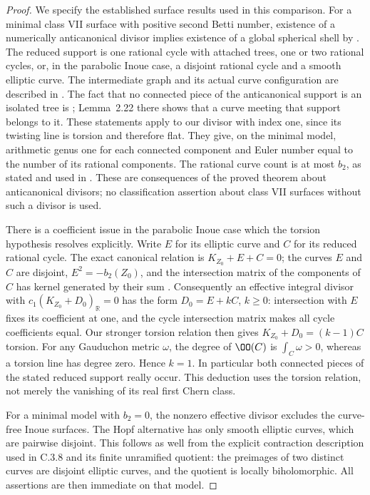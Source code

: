 \begin{proof}
We specify the established surface results used in this
comparison. For a minimal class VII surface with positive
second Betti number, existence of a numerically
anticanonical divisor implies existence of a global
spherical shell by
\cite[Theorem~0.2, Proposition~2.29 and Theorem~2.38]{Dloussky2006}.
The reduced support is one rational cycle with attached
trees, one or two rational cycles, or, in the parabolic
Inoue case, a disjoint rational cycle and a smooth elliptic
curve. The intermediate graph and its actual curve
configuration are described in
\cite[\S1, pp.~284--285, and \S3, p.~296]{DOT2003}.
The fact that no connected piece of the anticanonical
support is an isolated tree is
\cite[Corollary~2.25 and Proposition~2.27]{Dloussky2006};
Lemma~2.22 there shows that a curve meeting that support
belongs to it. These statements apply to our divisor with
index one, since its twisting line is torsion and therefore
flat. They give, on the minimal model, arithmetic genus
one for each connected component and Euler number equal
to the number of its rational components. The rational
curve count is at most $b_2$, as stated and used in
\cite[Introduction, p.~283]{DOT2003}.
These are consequences of the proved theorem about
anticanonical divisors; no classification assertion about
class VII surfaces without such a divisor is used.

There is a coefficient issue in the parabolic Inoue case
which the torsion hypothesis resolves explicitly. Write
$E$ for its elliptic curve and $C$ for its reduced rational
cycle. The exact canonical relation is
$K_{Z_0}+E+C=0$; the curves $E$ and $C$ are disjoint,
$E^2=-b_2(Z_0)$, and the intersection matrix of the
components of $C$ has kernel generated by their sum
\cite[Lemma~2.22 and the following paragraph; Proposition~2.27]{Dloussky2006}.
Consequently an effective integral divisor with
$c_1(K_{Z_0}+D_0)_{\mathbb R}=0$ has the form
$D_0=E+kC$, $k\ge0$: intersection with $E$ fixes its
coefficient at one, and the cycle intersection matrix
makes all cycle coefficients equal. Our stronger
torsion relation then gives
$K_{Z_0}+D_0=(k-1)C$ torsion. For any Gauduchon metric
$\omega$, the degree of $\OO(C)$ is
$\int_C\omega>0$, whereas a torsion line has degree
zero. Hence $k=1$. In particular both connected
pieces of the stated reduced support really occur.
This deduction uses the torsion relation, not merely
the vanishing of its real first Chern class.

For a minimal model with $b_2=0$, the nonzero effective
divisor excludes the curve-free Inoue surfaces. The
Hopf alternative has only smooth elliptic curves, which
are pairwise disjoint. This follows as well from the
explicit contraction description used in C.3.8 and its
finite unramified quotient: the preimages of two distinct
curves are disjoint elliptic curves, and the quotient
is locally biholomorphic. All assertions are then
immediate on that model.


\end{proof}
